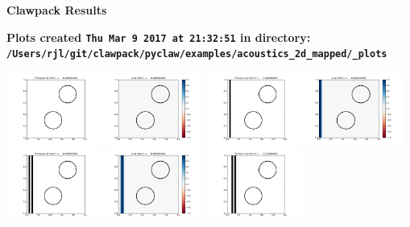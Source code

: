 \documentclass[11pt]{article}
\begin{document}
        \begin{center}{\Large\bf Clawpack Results}\vskip 5pt
        
        \bf Plots created {\tt Thu Mar  9 2017 at 21:32:51} in directory: \vskip 5pt
        \verb+/Users/rjl/git/clawpack/pyclaw/examples/acoustics_2d_mapped/_plots+
        \end{center}
        \vskip 5pt
        \includegraphics[width=0.2375\textwidth]{frame0000fig0.png}
\includegraphics[width=0.2375\textwidth]{frame0000fig1.png}
\includegraphics[width=0.2375\textwidth]{frame0001fig0.png}
\includegraphics[width=0.2375\textwidth]{frame0001fig1.png}
\vskip 10pt 
\includegraphics[width=0.2375\textwidth]{frame0002fig0.png}
\includegraphics[width=0.2375\textwidth]{frame0002fig1.png}
\includegraphics[width=0.2375\textwidth]{frame0003fig0.png}
\end{document}
